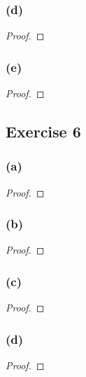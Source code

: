 \documentclass[14pt]{extarticle}
\begin{document}
\subsubsection{(d)}

\begin{proof}

\end{proof}

\subsubsection{(e)}

\begin{proof}

\end{proof}

\subsection{Exercise 6}

\subsubsection{(a)}

\begin{proof}

\end{proof}

\subsubsection{(b)}

\begin{proof}

\end{proof}

\subsubsection{(c)}

\begin{proof}

\end{proof}

\subsubsection{(d)}

\begin{proof}

\end{proof}
\end{document}
